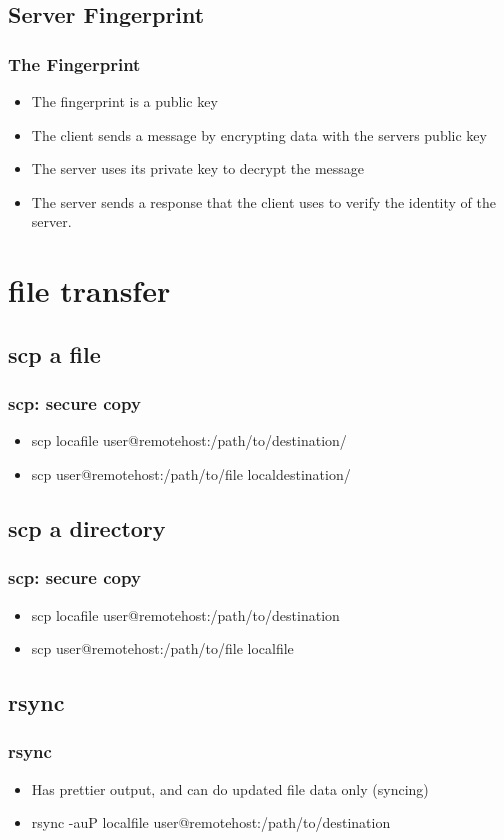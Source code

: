\documentclass[hyperref={pdfpagelabels=false}]{beamer}
\begin{document}
\subsection{Server Fingerprint}
\frame
{
    \frametitle{The Fingerprint}
    \begin{itemize}
    \item{The fingerprint is a public key}
    \item{The client sends a message by encrypting data with the servers public key}
    \item{The server uses its private key to decrypt the message}
    \item{The server sends a response that the client uses to verify the identity of the server.}
    \end{itemize}
}
\section{file transfer}
\subsection{scp a file}
\frame
{
    \frametitle{scp: secure copy}
    \begin{itemize}
    \item{scp locafile user@remotehost:/path/to/destination/}
    \item{scp user@remotehost:/path/to/file localdestination/}
    \end{itemize}
}
\subsection{scp a directory}
\frame
{
    \frametitle{scp: secure copy}
    \begin{itemize}
    \item{scp locafile user@remotehost:/path/to/destination}
    \item{scp user@remotehost:/path/to/file localfile}
    \end{itemize}
}
\subsection{rsync}
\frame
{
    \frametitle{rsync}
    \begin{itemize}
    \item{Has prettier output, and can do updated file data only (syncing)}
    \item{rsync -auP localfile user@remotehost:/path/to/destination}
    \end{itemize}
}
\end{document}
